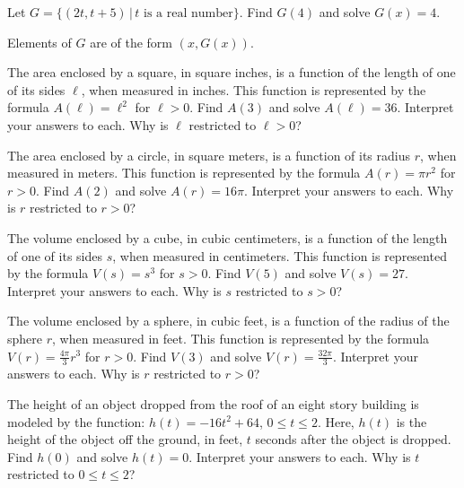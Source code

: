 \documentclass{ximera}
\begin{document}
\begin{problem}
Let $G = \{ (2t, t+5) \, | \, \text{$t$ is a real number} \}$.  Find $G(4)$ and solve $G(x) = 4$.

\begin{hint}
Elements of $G$ are of the form $(x, G(x))$.
\end{hint}
\end{problem}

\begin{problem}
The area enclosed by a square, in square inches,  is a function of the length of one of its sides $\ell$, when measured in inches.  This function is represented by the formula $A(\ell) = \ell^2$ for $\ell > 0$.  Find $A(3)$ and solve $A(\ell) = 36$.  Interpret your answers to each.  Why is $\ell$ restricted to $\ell > 0$?
\end{problem}

\begin{problem}
The area enclosed by a circle, in square meters, is a function of its radius $r$, when measured in meters.  This function is represented by the formula $A(r) = \pi r^2$ for $r > 0$.  Find $A(2)$ and solve $A(r) = 16\pi$.  Interpret your answers to each.  Why is $r$ restricted to $r > 0$?
\end{problem}

\begin{problem}
The volume  enclosed by a cube, in cubic centimeters, is a function of the length of one of its sides $s$, when measured in centimeters.   This function is represented by the formula $V(s) = s^3$ for $s > 0$.  Find $V(5)$ and solve $V(s) = 27$.  Interpret your answers to each.  Why is $s$ restricted to $s > 0$?
\end{problem}

\begin{problem}
The volume enclosed by a sphere, in cubic feet, is a function of the radius of the sphere $r$, when measured in feet. This function is represented by the formula  $V(r) =\frac{4\pi}{3} r^{3}$ for $r > 0$.  Find $V(3)$ and solve $V(r) = \frac{32\pi}{3}$.  Interpret your answers to each.  Why is $r$ restricted to $r > 0$?
\end{problem}

\begin{problem}
The height of an object dropped from the roof of an eight story building is modeled by the function:  $h(t) = -16t^2 + 64$, $0 \leq t \leq 2$. Here,  $h(t)$ is the height of the object off the ground, in feet, $t$ seconds after the object is dropped.  Find $h(0)$ and solve $h(t) = 0$.  Interpret your answers to each.  Why is $t$ restricted to $0 \leq t \leq 2$?
\end{problem}
\end{document}
